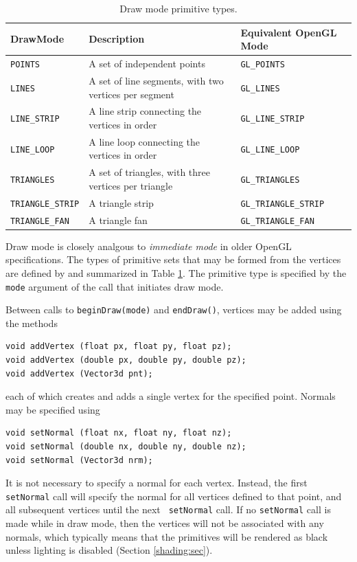 \begin{table}[h]
\begin{center}
\begin{tabular}{|lll|}
\hline
DrawMode & Description & Equivalent OpenGL Mode\\
\hline
{\tt POINTS} & A set of independent points & {\tt GL\_POINTS} \\
{\tt LINES} & A set of line segments, with two vertices 
per segment & {\tt GL\_LINES}\\
{\tt LINE\_STRIP} & A line strip connecting the vertices in order &
{\tt GL\_LINE\_STRIP}\\
{\tt LINE\_LOOP} & A line loop connecting the vertices in order &
{\tt GL\_LINE\_LOOP}\\
{\tt TRIANGLES} & A set of triangles, with three vertices
per triangle & {\tt GL\_TRIANGLES}\\
{\tt TRIANGLE\_STRIP} & A triangle strip & {\tt GL\_TRIANGLE\_STRIP} \\
{\tt TRIANGLE\_FAN} & A triangle fan &
{\tt GL\_TRIANGLE\_FAN}\\
\hline
\end{tabular}
\end{center}
\caption{Draw mode primitive types.}
\label{DrawMode:tab}
\end{table}

Draw mode is closely analgous to {\it immediate mode} in older
OpenGL specifications. The types of primitive sets that may be formed from
the vertices are defined by
 and summarized in Table
\ref{DrawMode:tab}.
The primitive type is specified by the {\tt mode} argument of the
call that initiates draw mode.

Between calls to {\tt beginDraw(mode)} and {\tt endDraw()}, vertices
may be added using the methods
%
\begin{lstlisting}[]
void addVertex (float px, float py, float pz);
void addVertex (double px, double py, double pz);
void addVertex (Vector3d pnt);
\end{lstlisting}
%
each of which creates and adds a single vertex for the specified
point.
Normals may be specified using
\begin{lstlisting}[]
void setNormal (float nx, float ny, float nz);
void setNormal (double nx, double ny, double nz);
void setNormal (Vector3d nrm);
\end{lstlisting}
%
It is not necessary to specify a normal for each vertex. Instead, the
first {\tt setNormal} call will specify the normal for all vertices
defined to that point, and all subsequent vertices until the next {\tt
setNormal} call. If no {\tt setNormal} call is made while in draw mode,
then the vertices will not be
associated with any normals, which typically means that the primitives
will be rendered as black unless lighting is disabled (Section
\ref{shading:sec}).

